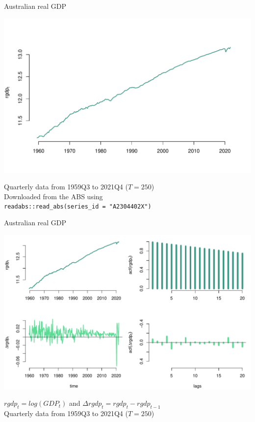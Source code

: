\documentclass[notes,blackandwhite,mathsans,usenames,dvipsnames]{beamer}
\begin{document}
\begin{frame}{Australian real GDP}

\centering
\includegraphics[scale=0.55, trim=2cm 1cm 2cm 0cm]{results/data-gdp.pdf}

\bigskip\small{\color{mcxs2}
Quarterly data from 1959Q3 to 2021Q4 ($T=250$)\\ 
Downloaded from the ABS using }\\ \texttt{readabs::read\_abs(series\_id = "A2304402X")}

\end{frame}




\begin{frame}{Australian real GDP}

\centering
\includegraphics[scale=0.55, trim=2cm 0.5cm 2cm 0cm]{results/data-gdp-acf.pdf}

\bigskip\small{\color{mcxs2}
$rgdp_t= log(GDP_t)$ and $\Delta rgdp_t= rgdp_t - rgdp_{t-1}$ \\
Quarterly data from 1959Q3 to 2021Q4 ($T=250$)}

\end{frame}
\end{document}
